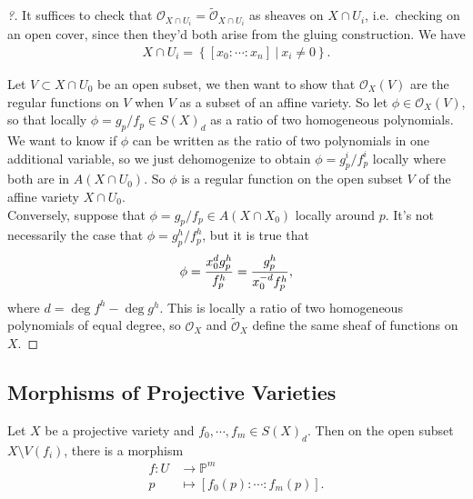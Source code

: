 \begin{proof}[?]

It suffices to check that
\({\mathcal{O}}_{X\cap U_i} = \tilde {\mathcal{O}}_{X\cap U_i}\) as
sheaves on \(X\cap U_i\), i.e.~checking on an open cover, since then
they'd both arise from the gluing construction. We have
\begin{align*}  
X\cap U_i = \left\{{[x_0 : \cdots: x_n] {~\mathrel{\Big|}~}x_i \neq 0 }\right\}
.\end{align*}

Let \(V\subset X\cap U_0\) be an open subset, we then want to show that
\({\mathcal{O}}_X(V)\) are the regular functions on \(V\) when \(V\) as
a subset of an affine variety. So let \(\phi\in {\mathcal{O}}_X(V)\), so
that locally \(\phi = g_p/f_p \in S(X)_d\) as a ratio of two homogeneous
polynomials. We want to know if \(\phi\) can be written as the ratio of
two polynomials in one additional variable, so we just dehomogenize to
obtain \(\phi = g^i_p / f^i_p\) locally where both are in
\(A(X\cap U_0)\). So \(\phi\) is a regular function on the open subset
\(V\) of the affine variety \(X\cap U_0\).\\

Conversely, suppose that \(\phi = g_p/f_p \in A(X\cap X_0)\) locally
around \(p\). It's not necessarily the case that
\(\phi = g^h_p / f^h_p\), but it is true that
\begin{align*}  
\phi = {x_0^d g_p^h \over f_p^h} = {g_p^h \over x_0^{-d} f_p^h}
,\end{align*}
where \(d = \deg f^h - \deg g^h\). This is locally a ratio of two
homogeneous polynomials of equal degree, so \({\mathcal{O}}_X\) and
\(\tilde {\mathcal{O}}_X\) define the same sheaf of functions on \(X\).

\end{proof}

\hypertarget{morphisms-of-projective-varieties}{%
\subsection{Morphisms of Projective
Varieties}\label{morphisms-of-projective-varieties}}

\begin{lemma}[?]

Let \(X\) be a projective variety and \(f_0, \cdots, f_m \in S(X)_d\).
Then on the open subset \(X\setminus V(f_i)\), there is a morphism
\begin{align*}  
f: U &\to {\mathbb{P}}^m \\
p &\mapsto {\left[ {f_0(p) : \cdots : f_m(p) } \right]}
.\end{align*}

\end{lemma}

